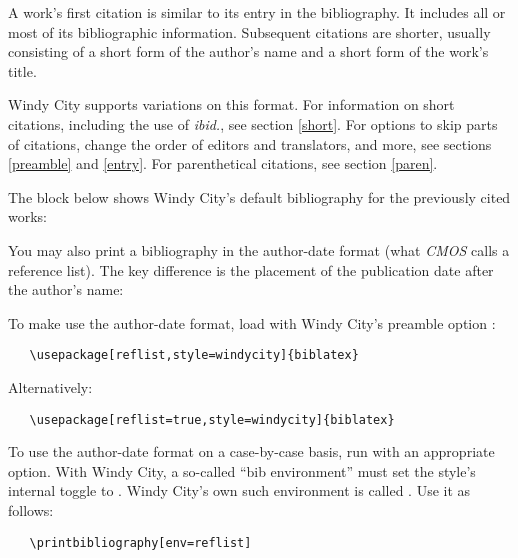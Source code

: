 \documentclass[11pt,letterpaper,oneside]{article}
\begin{document}
A work's first citation is similar to its entry in the bibliography.
It includes all or most of its bibliographic information. Subsequent
citations are shorter, usually consisting of a short form of the
author's name and a short form of the work's title.

Windy City supports variations on this format. For information on
short citations, including the use of \textit{ibid.}, see section
\ref{short}. For options to skip parts of citations, change the order
of editors and translators, and more, see sections \ref{preamble} and
\ref{entry}. For parenthetical citations, see section \ref{paren}.

The block below shows Windy City's default bibliography for the
previously cited works:

\begin{bibonly}
\nocite{kaiser1964,morley1995,schwartz1992}
\end{bibonly}

You may also print a bibliography in the author-date format (what
\textit{CMOS} calls a reference list). The key difference is the
placement of the publication date after the author's name:

\begin{refonly}
\nocite{kaiser1964,morley1995,schwartz1992}
\end{refonly}

To make  use the author-date format, load
\biblatex with Windy City's preamble option :

\begin{verbatim}
   \usepackage[reflist,style=windycity]{biblatex}
\end{verbatim}

\noindent Alternatively:

\begin{verbatim}
   \usepackage[reflist=true,style=windycity]{biblatex}
\end{verbatim}

To use the author-date format on a case-by-case basis, run
 with an appropriate  option. With
Windy City, a so-called ``bib environment'' must set the style's
internal  toggle to . Windy City's own such
environment is called . Use it as follows:

\begin{verbatim}
   \printbibliography[env=reflist]
\end{verbatim}
\end{document}
